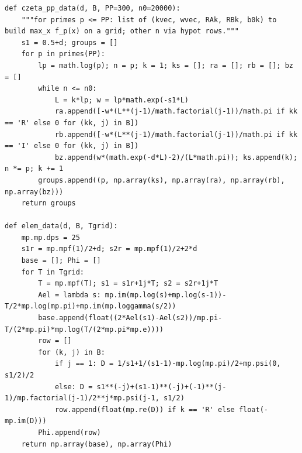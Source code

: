 \documentclass[11pt,reqno]{amsart}
\numberwithin{equation}{section}
\theoremstyle{definition}
\theoremstyle{remark}
\begin{document}
\begin{lstlisting}
def czeta_pp_data(d, B, PP=300, n0=20000):
    """for primes p <= PP: list of (kvec, wvec, RAk, RBk, b0k) to build max_x f_p(x) on a grid; other n via hypot rows."""
    s1 = 0.5+d; groups = []
    for p in primes(PP):
        lp = math.log(p); n = p; k = 1; ks = []; ra = []; rb = []; bz = []
        while n <= n0:
            L = k*lp; w = lp*math.exp(-s1*L)
            ra.append([-w*(L**(j-1)/math.factorial(j-1))/math.pi if kk == 'R' else 0 for (kk, j) in B])
            rb.append([-w*(L**(j-1)/math.factorial(j-1))/math.pi if kk == 'I' else 0 for (kk, j) in B])
            bz.append(w*(math.exp(-d*L)-2)/(L*math.pi)); ks.append(k); n *= p; k += 1
        groups.append((p, np.array(ks), np.array(ra), np.array(rb), np.array(bz)))
    return groups

def elem_data(d, B, Tgrid):
    mp.mp.dps = 25
    s1r = mp.mpf(1)/2+d; s2r = mp.mpf(1)/2+2*d
    base = []; Phi = []
    for T in Tgrid:
        T = mp.mpf(T); s1 = s1r+1j*T; s2 = s2r+1j*T
        Ael = lambda s: mp.im(mp.log(s)+mp.log(s-1))-T/2*mp.log(mp.pi)+mp.im(mp.loggamma(s/2))
        base.append(float((2*Ael(s1)-Ael(s2))/mp.pi-T/(2*mp.pi)*mp.log(T/(2*mp.pi*mp.e))))
        row = []
        for (k, j) in B:
            if j == 1: D = 1/s1+1/(s1-1)-mp.log(mp.pi)/2+mp.psi(0, s1/2)/2
            else: D = s1**(-j)+(s1-1)**(-j)+(-1)**(j-1)/mp.factorial(j-1)/2**j*mp.psi(j-1, s1/2)
            row.append(float(mp.re(D)) if k == 'R' else float(-mp.im(D)))
        Phi.append(row)
    return np.array(base), np.array(Phi)


\end{lstlisting}
\end{document}
